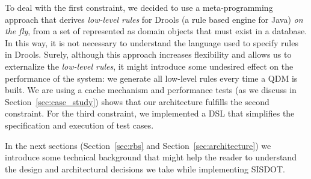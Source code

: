 To deal with the first constraint, we decided to use a meta-programming approach that derives 
\emph{low-level rules} for Drools (a rule based engine for Java) \emph{on the fly}, from a set of \callers represented 
as domain objects that must exist in a database. In this way, it is not necessary to understand 
the language used to specify rules in Drools. Surely, although this approach increases flexibility and  
allows us to externalize the \emph{low-level rules}, it might introduce some undesired effect on 
the performance of the system: we generate all low-level rules every time a QDM is built. We are using 
a cache mechanism and performance tests (as we discuss in Section~\ref{sec:case_study}) 
shows that our architecture fulfills the second constraint. For the third constraint, we implemented a DSL that simplifies the specification and 
execution of test cases. 

In the next sections (Section~\ref{sec:rbs} and Section~\ref{sec:architecture}) 
we introduce some technical background that might help the reader to understand 
the design and architectural decisions we take while implementing SISDOT.  
 



